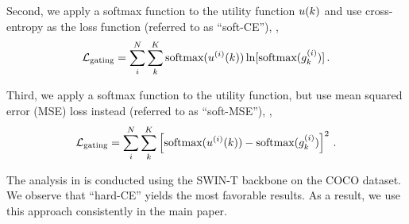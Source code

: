 Second, we apply a softmax function to the utility function $u(k)$ and use cross-entropy as the loss function (referred to as ``soft-CE''), \ie,
\[
\mathcal{L}_\text{gating}=\sum_i^N\sum_{k}^{K}\text{softmax}(u^{(i)}(k))\ln [\text{softmax}(g_k^{(i)})]\,.
\]

Third, we apply a softmax function to the utility function, but use mean squared error (MSE) loss instead (referred to as ``soft-MSE''), \ie,
\[
\mathcal{L}_\text{gating}=\sum_i^N\sum_{k}^{K}\left[\text{softmax}(u^{(i)}(k))-\text{softmax}(g_k^{(i)})\right]^2\,.
\]

The analysis in  is conducted using the SWIN-T \cite{liu2021swin} backbone on the COCO dataset. We observe that ``hard-CE'' yields the most favorable results. As a result, we use this approach consistently in the main paper.


